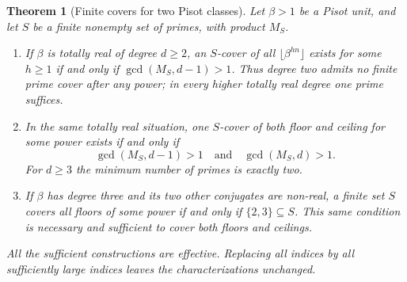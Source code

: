 \documentclass[11pt,a4paper]{article}
\newtheorem{theorem}{Theorem}[section]
\theoremstyle{definition}
\theoremstyle{remark}
\numberwithin{equation}{section}
\begin{document}
\begin{theorem}[Finite covers for two Pisot classes]
\label{tw:thm:pisot-cover-classification}
Let $\beta>1$ be a Pisot unit, and let $S$ be a finite nonempty set of
primes, with product $M_S$.
\begin{enumerate}
\item If $\beta$ is totally real of degree $d\ge2$, an $S$-cover of
all $\lfloor\beta^{hn}\rfloor$ exists for some $h\ge1$ if and only if
$\gcd(M_S,d-1)>1$.  Thus degree two admits no finite prime cover after
any power; in every higher totally real degree one prime suffices.
\item In the same totally real situation, one $S$-cover of both floor
and ceiling for some power exists if and only if
\[
 \gcd(M_S,d-1)>1\quad\text{and}\quad\gcd(M_S,d)>1.
\]
For $d\ge3$ the minimum number of primes is exactly two.
\item If $\beta$ has degree three and its two other conjugates are
non-real, a finite set $S$ covers all floors of some power if and only
if $\{2,3\}\subseteq S$.  This same condition is necessary and sufficient
to cover both floors and ceilings.
\end{enumerate}
All the sufficient constructions are effective.  Replacing all indices
by all sufficiently large indices leaves the characterizations unchanged.
\end{theorem}
\end{document}
